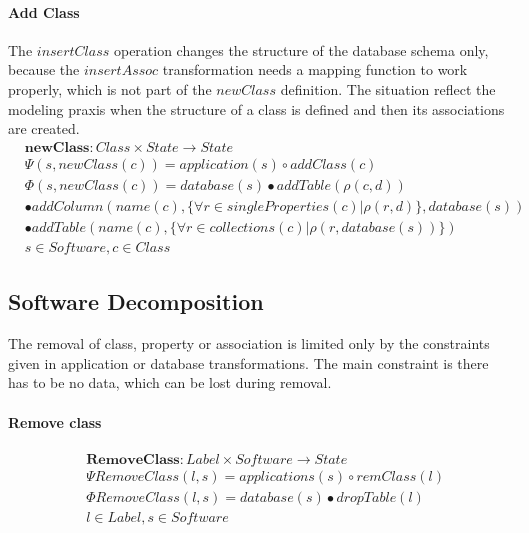 \documentclass[11pt]{article}
\begin{document}
\paragraph{Add Class} The $insertClass$ operation changes the structure of the database schema only, because the $insertAssoc$ transformation needs a mapping function to work properly, which is not part of the $newClass$ definition. The situation reflect the modeling praxis when the structure of a class is defined and then its associations are created.
\begin{align*}
& \mathbf{newClass} : Class \times State \rightarrow State \\
& \Psi(s, newClass(c)) = application(s) \circ addClass(c) \\
& \Phi(s, newClass(c)) = database(s)  \bullet addTable(\rho(c,d)) \\ 
& \bullet addColumn(name(c), \{\forall r \in singleProperties(c) | \rho(r,d)\}, database(s)) \\
& \bullet addTable(name(c), \{\forall r \in collections(c) | \rho(r,database(s))\})  \\
& s \in Software, c \in Class
\end{align*}




\subsection{Software Decomposition}
The removal of class, property or association is limited only by the constraints given in application or database transformations. The main constraint is there has to be no data, which can be lost during removal. 
\paragraph{Remove class}
\begin{align*}
&	\mathbf{RemoveClass}: Label \times Software \rightarrow State  \\
&	\Psi RemoveClass(l, s) = applications(s) \circ remClass(l) \\
&	\Phi RemoveClass(l, s) = database(s) \bullet dropTable(l) \\
&	l \in Label, s \in Software 
\end{align*}
\end{document}
